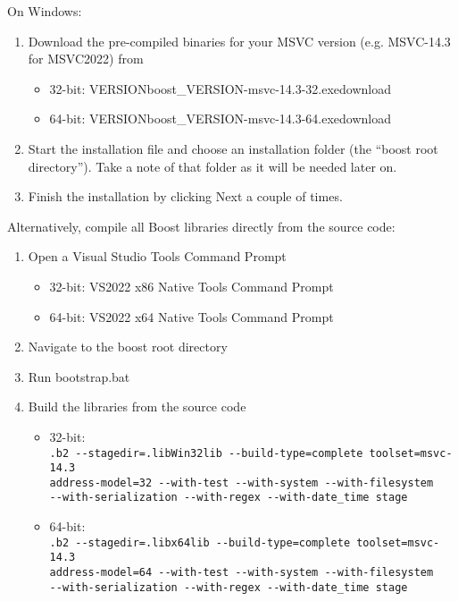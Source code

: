 \medskip
On Windows:
\begin{enumerate}
\item Download the pre-compiled binaries for your MSVC version (e.g. MSVC-14.3 for MSVC2022) from \cite{boost-binaries}
\begin{itemize}
\item 32-bit: \cite{boost-binaries}{\bs}VERSION{\bs}boost\_VERSION-msvc-14.3-32.exe{\bs}download 
\item 64-bit: \cite{boost-binaries}{\bs}VERSION{\bs}boost\_VERSION-msvc-14.3-64.exe{\bs}download
\end{itemize}
\item Start the installation file and choose an installation folder (the ``boost root directory'').
  Take a note of that folder as it will be needed later on.   
\item Finish the installation by clicking Next a couple of times.
\end{enumerate}
    
Alternatively, compile all Boost libraries directly from the source code:
\begin{enumerate}
\item Open a Visual Studio Tools Command Prompt
\begin{itemize}
\item 32-bit: VS2022 x86 Native Tools Command Prompt
\item 64-bit: VS2022 x64 Native Tools Command Prompt
\end{itemize}
\item Navigate to the boost root directory
\item Run bootstrap.bat
\item Build the libraries from the source code
\begin{itemize}
\item 32-bit: \\
  {\footnotesize\tt .{\bs}b2 -{}-stagedir=.{\bs}lib{\bs}Win32{\bs}lib -{}-build-type=complete toolset=msvc-14.3 \bs \\
    address-model=32 -{}-with-test -{}-with-system -{}-with-filesystem  \bs \\
    -{}-with-serialization -{}-with-regex -{}-with-date\_time stage}
\item 64-bit: \\
  {\footnotesize\tt .{\bs}b2 -{}-stagedir=.{\bs}lib{\bs}x64{\bs}lib -{}-build-type=complete toolset=msvc-14.3 \bs \\
    address-model=64 -{}-with-test -{}-with-system -{}-with-filesystem \bs \\
    -{}-with-serialization -{}-with-regex -{}-with-date\_time stage}
\end{itemize}
\end{enumerate}


